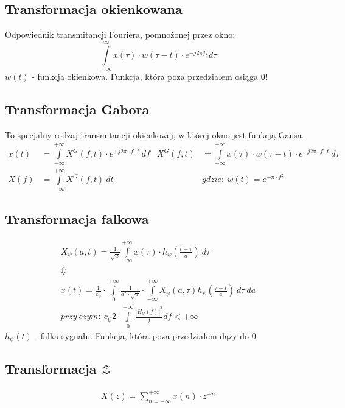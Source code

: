    \subsection{Transformacja okienkowana}
        \tab Odpowiednik transmitancji Fouriera, pomnożonej przez okno:
        \begin{equation*}
            \int \limits_{-\infty}^{\infty} x(\tau) \cdot  w(\tau-t) \cdot e^{-j2\pi f \tau}d\tau
        \end{equation*}
        $w(t)$ - funkcja okienkowa. Funkcja, która poza przedziałem osiąga 0!

    \subsection{Transformacja Gabora}
        \tab To specjalny rodzaj transmitancji okienkowej, w której okno jest funkcją Gausa.
        \begin{align*}
                x(t) &= \int \limits_{-\infty}^{+\infty} X^G(f, t)\cdot e^{+j2\pi \cdot f \cdot t}\ df &
                X^G(f, t) &= \int \limits_{-\infty}^{+\infty}x(\tau)\cdot w(\tau-t)\cdot e^{-j2\pi\cdot f\cdot t}\ d\tau\\
                X(f) &= \int \limits_{-\infty}^{+\infty} X^G(f, t)\ dt &
                &gdzie:\ w(t) = e^{-\pi\cdot f^2}
        \end{align*}
    
    \subsection{Transformacja falkowa}
        \begin{gather*}
            X_\psi(a, t) = \frac{1}{\sqrt{a}}\int\limits_{-\infty}^{+\infty}x(\tau)\cdot h_\psi\left(\frac{t-\tau}{a}\right)\ d\tau\\
            \Updownarrow\\
            x(t) = \frac{1}{c_\psi}\cdot \int\limits_{0}^{+\infty}\frac{1}{a^2\cdot\sqrt{a}}\cdot \int\limits_{-\infty}^{+\infty}X_\psi(a, \tau)h_\psi\left(\frac{\tau-t}{a}\right)\ d\tau\ da\\
            przy\ czym:\ c_\psi 2\cdot \int\limits_{0}^{+\infty}\frac{|H_\psi(f)|^2}{f}df < +\infty
        \end{gather*}
        $h_\psi(t)$ - falka sygnału. Funkcja, która poza przedziałem dąży do 0


    \subsection{Transformacja $\mathcal{Z} $}
        \begin{align*}
            X(z) = \sum_{n=-\infty}^{+\infty}x(n)\cdot z^{-n}
        \end{align*}
    